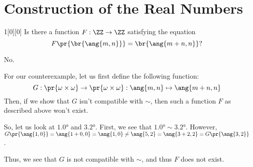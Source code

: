 \documentclass{article}
\begin{document}
\section{Construction of the Real Numbers}
\begin{hw}{1}[0][0]
	Is there a function $F : \ZZ \rightarrow \ZZ$ satisfying the equation
	\begin{equation*}
		F\pr{\br{\ang{m,n}}} = \br{\ang{m+n, n}}?
	\end{equation*}
\end{hw}
\begin{solution}
	No.
	
	For our counterexample, let us first define the following function:
	\begin{equation*}
		G : \pr{\omega \times \omega} \rightarrow \pr{\omega \times \omega} : \ang{m, n} \mapsto \ang{m+n, n}
	\end{equation*}
	Then, if we show that $G$ isn't compatible with $\sim$, then such a function $F$ as described above won't exist.
	
	So, let us look at $\ang{1,0}$ and $\ang{3,2}$. First, we see that $\ang{1,0} \sim \ang{3,2}$. However, $G\pr{\ang{1, 0}} = \ang{1+0, 0} = \ang{1,0} \not\sim \ang{5,2} = \ang{3+2,2} = G\pr{\ang{3,2}}$.
	
	Thus, we see that $G$ is not compatible with $\sim$, and thus $F$ does not exist.
\end{solution}
\end{document}
